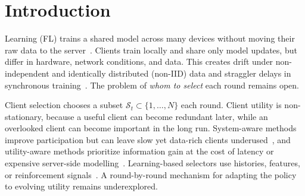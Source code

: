 \documentclass[journal]{IEEEtran}
\theoremstyle{remark}
\newcommand{\revision}[1]{#1}
\begin{document}
\section{Introduction}

 Learning (FL) trains a shared model across many devices without moving their raw data to the server~\cite{mcmahan2017communication}. \revision{Clients train locally and share only model updates, but differ in hardware, network conditions, and data. This creates drift under non-independent and identically distributed (non-IID) data and straggler delays in synchronous training}~\cite{karimireddy2020scaffold,mai2024study,tapwal2026stragglers,forootani2026asynchronous,borazjani2026redefining}. The problem of \textit{whom to select} each round remains open.

Client selection chooses a subset $\revision{\mathcal{S}_t} \subset \{1, \ldots, N\}$ each round. \revision{Client utility is non-stationary, because a useful client can become redundant later, while an overlooked client can become important in the long run.} System-aware methods improve participation but can leave slow yet data-rich clients underused~\cite{nishio2019client,chai2020tifl}, and utility-aware methods prioritize information gain at the cost of latency or expensive server-side modelling~\cite{lai2021oort,tang2022fedcor,xu2024federated,yan2023criticalfl,ning2024fedgcs}. Learning-based selectors use histories, features, or reinforcement signals~\cite{wang2020optimizing,pan2024contextual,kazemi2026robust}. \revision{A round-by-round mechanism for adapting the policy to evolving utility remains underexplored.}
\end{document}

